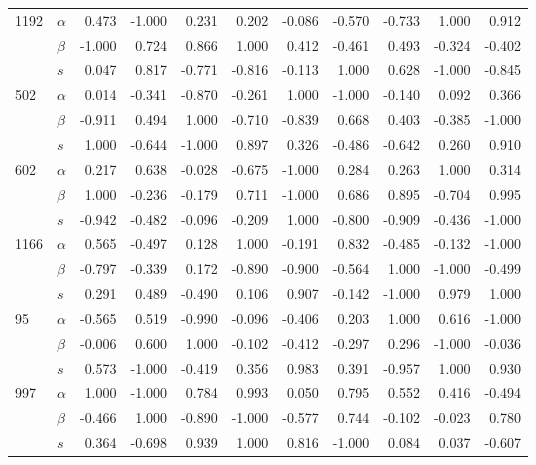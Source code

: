 \begin{longtable}{llrrrrrrrrr}
\cline{1-11}
\multirow{3}{*}{1192} & $\alpha$ &  0.473 & -1.000 &  0.231 &  0.202 & -0.086 & -0.570 & -0.733 &  1.000 &  0.912 \\
     & $\beta$ & -1.000 &  0.724 &  0.866 &  1.000 &  0.412 & -0.461 &  0.493 & -0.324 & -0.402 \\
     & $s$ &  0.047 &  0.817 & -0.771 & -0.816 & -0.113 &  1.000 &  0.628 & -1.000 & -0.845 \\
\cline{1-11}
\multirow{3}{*}{502} & $\alpha$ &  0.014 & -0.341 & -0.870 & -0.261 &  1.000 & -1.000 & -0.140 &  0.092 &  0.366 \\
     & $\beta$ & -0.911 &  0.494 &  1.000 & -0.710 & -0.839 &  0.668 &  0.403 & -0.385 & -1.000 \\
     & $s$ &  1.000 & -0.644 & -1.000 &  0.897 &  0.326 & -0.486 & -0.642 &  0.260 &  0.910 \\
\cline{1-11}
\multirow{3}{*}{602} & $\alpha$ &  0.217 &  0.638 & -0.028 & -0.675 & -1.000 &  0.284 &  0.263 &  1.000 &  0.314 \\
     & $\beta$ &  1.000 & -0.236 & -0.179 &  0.711 & -1.000 &  0.686 &  0.895 & -0.704 &  0.995 \\
     & $s$ & -0.942 & -0.482 & -0.096 & -0.209 &  1.000 & -0.800 & -0.909 & -0.436 & -1.000 \\
\cline{1-11}
\multirow{3}{*}{1166} & $\alpha$ &  0.565 & -0.497 &  0.128 &  1.000 & -0.191 &  0.832 & -0.485 & -0.132 & -1.000 \\
     & $\beta$ & -0.797 & -0.339 &  0.172 & -0.890 & -0.900 & -0.564 &  1.000 & -1.000 & -0.499 \\
     & $s$ &  0.291 &  0.489 & -0.490 &  0.106 &  0.907 & -0.142 & -1.000 &  0.979 &  1.000 \\
\cline{1-11}
\multirow{3}{*}{95} & $\alpha$ & -0.565 &  0.519 & -0.990 & -0.096 & -0.406 &  0.203 &  1.000 &  0.616 & -1.000 \\
     & $\beta$ & -0.006 &  0.600 &  1.000 & -0.102 & -0.412 & -0.297 &  0.296 & -1.000 & -0.036 \\
     & $s$ &  0.573 & -1.000 & -0.419 &  0.356 &  0.983 &  0.391 & -0.957 &  1.000 &  0.930 \\
\cline{1-11}
\multirow{3}{*}{997} & $\alpha$ &  1.000 & -1.000 &  0.784 &  0.993 &  0.050 &  0.795 &  0.552 &  0.416 & -0.494 \\
     & $\beta$ & -0.466 &  1.000 & -0.890 & -1.000 & -0.577 &  0.744 & -0.102 & -0.023 &  0.780 \\
     & $s$ &  0.364 & -0.698 &  0.939 &  1.000 &  0.816 & -1.000 &  0.084 &  0.037 & -0.607 \\
\end{longtable}
